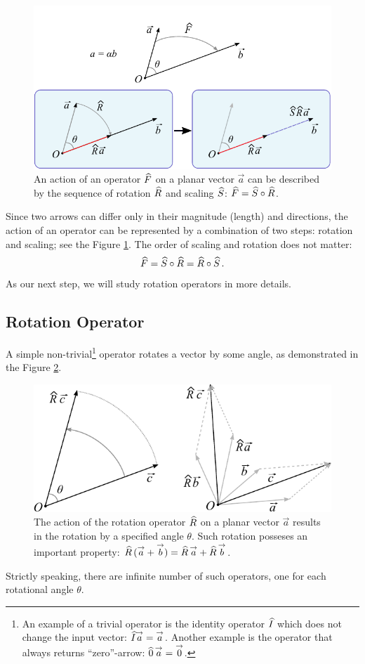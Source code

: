 \begin{figure}[htbp]
  \centering
  \includegraphics[scale=1.0]{operatorsAction}
  \caption{An action of an operator $\widehat{F}$ on a planar vector
    $\vec{a}$ can be described by the sequence of rotation $\widehat{R}$
    and scaling $\widehat{S}$: $\widehat{F}=\widehat{S}\circ\widehat{R}$.}
  \label{fig:operatorsAction}
\end{figure}
Since two arrows can differ only in their magnitude (length) and
directions, the action of an operator
 can be represented by a combination of two steps: rotation and
 scaling; see the Figure \ref{fig:operatorsAction}. The order of scaling
 and rotation does not matter:
 \[
 \widehat{F}=\widehat{S}\circ\widehat{R} = \widehat{R}\circ\widehat{S}\,.
 \]
 As our next step, we will study rotation operators in more details.

\subsection{Rotation Operator}
A simple non-trivial\footnote{An example of a trivial operator is the identity
operator $\widehat{I}$ which does not change the input vector: $\widehat{I}
\overset{\rightarrow}{a} = \overset{\rightarrow}{a}$. Another example is the operator that always
returns ``zero''-arrow: $\widehat{0}\,\overset{\rightarrow}{a}=\overset{\rightarrow}{0}$.} operator rotates
a vector by some angle, as demonstrated in the Figure \ref{fig:operatorsRotator}.
\begin{figure}[htbp]
  \centering
  \includegraphics[scale=1.0]{operatorsRotator}
  \caption{The action of the rotation operator $\widehat{R}$ on a planar vector
    $\vec{a}$ results in the rotation by a specified angle
    $\theta$. Such rotation posseses an important property: $\widehat{R}\,(\overset{\rightarrow}{a}+\overset{\rightarrow}{b})=\widehat{R}\,\overset{\rightarrow}{a}+\widehat{R}\,\overset{\rightarrow}{b}$.}
  \label{fig:operatorsRotator}
\end{figure}
Strictly speaking, there are infinite number of such operators, one
for each rotational angle $\theta$.

